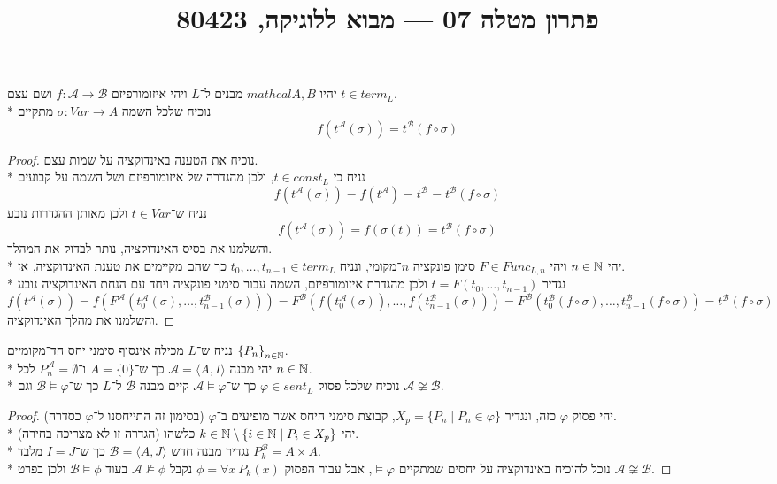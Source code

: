
\title{פתרון מטלה 07 --- מבוא ללוגיקה, 80423}


\maketitle
\maketitleprint{}

\question{}
יהיו $mathcal{A, B}$ מבנים ל־$L$ ויהי איזומורפיזם $f : \mathcal{A} \to \mathcal{B}$ ושם עצם $t \in term_L$. \\*
נוכיח שלכל השמה $\sigma : Var \to A$ מתקיים
\[
	f(t^\mathcal{A}(\sigma))
	= t^\mathcal{B}(f \circ \sigma)
\]
\begin{proof}
	נוכיח את הטענה באינדוקציה על שמות עצם. \\*
	נניח כי $t \in const_L$, ולכן מהגדרה של איזומורפיזם ושל השמה על קבועים
	\[
		f(t^\mathcal{A}(\sigma))
		= f(t^\mathcal{A})
		= t^\mathcal{B}
		= t^\mathcal{B}(f \circ \sigma)
	\]
	נניח ש־$t \in Var$ ולכן מאותן ההגדרות נובע
	\[
		f(t^\mathcal{A}(\sigma))
		= f(\sigma(t))
		= t^\mathcal{B}(f \circ \sigma)
	\]
	והשלמנו את בסיס האינדוקציה, נותר לבדוק את המהלך. \\*
	יהי $n \in \mathbb{N}$ ויהי $F \in Func_{L, n}$ סימן פונקציה $n$־מקומי, ונניח $t_0, \dots, t_{n - 1} \in term_L$ כך שהם מקיימים את טענת האינדוקציה, אז. \\*
	נגדיר $t = F(t_0, \dots, t_{n - 1})$ ולכן מהגדרת איזומורפיזם, השמה עבור סימני פונקציה ויחד עם הנחת האינדוקציה נובע
	\[
		f(t^\mathcal{A}(\sigma))
		= f(F^\mathcal{A}(t_0^\mathcal{A}(\sigma), \dots, t_{n - 1}^\mathcal{B}(\sigma)))
		= F^\mathcal{B}(f(t_0^\mathcal{A}(\sigma)), \dots, f(t_{n - 1}^\mathcal{B}(\sigma)))
		= F^\mathcal{B}(t_0^\mathcal{B}(f \circ \sigma), \dots, t_{n - 1}^\mathcal{B}(f \circ \sigma))
		= t^\mathcal{B}(f \circ \sigma)
	\]
	והשלמנו את מהלך האינדוקציה.
\end{proof}

\question{}
נניח ש־$L$ מכילה אינסוף סימני יחס חד־מקומיים ${\{P_n\}}_{n \in \mathbb{N}}$. \\*
יהי מבנה $\mathcal{A} = \langle A, I \rangle$ כך ש־$A = \{0\}$ ו־$P_n^\mathcal{A} = \emptyset$ לכל $n \in \mathbb{N}$. \\*
נוכיח שלכל פסוק $\varphi \in sent_L$ כך ש־$\mathcal{A} \models \varphi$ קיים מבנה $\mathcal{B}$ ל־$L$ כך ש־$\mathcal{B} \models \varphi$ וגם $\mathcal{A} \not\cong \mathcal{B}$.
\begin{proof}
	יהי פסוק $\varphi$ כזה, ונגדיר $X_p = \{P_n \mid P_n \in \varphi\}$, קבוצת סימני היחס אשר מופיעים ב־$\varphi$ (בסימון זה התייחסנו ל־$\varphi$ כסדרה). \\*
	יהי $k \in \mathbb{N} \setminus \{i \in \mathbb{N} \mid P_i \in X_p\}$ כלשהו (הגדרה זו לא מצריכה בחירה). \\*
	נגדיר מבנה חדש $\mathcal{B} = \langle A, J\rangle$ כך ש־$I = J$ מלבד $P_k^\mathcal{B} = A \times A$. \\*
	נוכל להוכיח באינדוקציה על יחסים שמתקיים $\mathcal \models \varphi$, אבל עבור הפסוק $\phi = \forall x\ P_k(x)$ נקבל $\mathcal{A} \not\models \phi$ בעוד $\mathcal{B} \models \phi$ ולכן בפרט $\mathcal{A} \not\cong \mathcal{B}$.
\end{proof}

